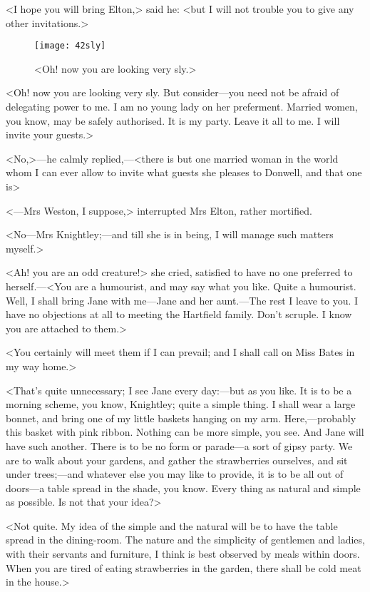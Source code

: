 <I hope you will bring Elton,> said he: <but I will not trouble you to give any other invitations.>

\begin{figure}[tbph]
\centering
\texttt{[image: 42sly]}
\caption{<Oh! now you are looking very sly.>}
\end{figure}


<Oh! now you are looking very sly. But consider—you need not be afraid of delegating power to me. I am no young lady on her preferment. Married women, you know, may be safely authorised. It is my party. Leave it all to me. I will invite your guests.>

<No,>—he calmly replied,—<there is but one married woman in the world whom I can ever allow to invite what guests she pleases to Donwell, and that one is\longdash>

<—Mrs Weston, I suppose,> interrupted Mrs Elton, rather mortified.

<No—Mrs Knightley;—and till she is in being, I will manage such matters myself.>

<Ah! you are an odd creature!> she cried, satisfied to have no one preferred to herself.—<You are a humourist, and may say what you like. Quite a humourist. Well, I shall bring Jane with me—Jane and her aunt.—The rest I leave to you. I have no objections at all to meeting the Hartfield family. Don't scruple. I know you are attached to them.>

<You certainly will meet them if I can prevail; and I shall call on Miss Bates in my way home.>

<That's quite unnecessary; I see Jane every day:—but as you like. It is to be a morning scheme, you know, Knightley; quite a simple thing. I shall wear a large bonnet, and bring one of my little baskets hanging on my arm. Here,—probably this basket with pink ribbon. Nothing can be more simple, you see. And Jane will have such another. There is to be no form or parade—a sort of gipsy party. We are to walk about your gardens, and gather the strawberries ourselves, and sit under trees;—and whatever else you may like to provide, it is to be all out of doors—a table spread in the shade, you know. Every thing as natural and simple as possible. Is not that your idea?>

<Not quite. My idea of the simple and the natural will be to have the table spread in the dining-room. The nature and the simplicity of gentlemen and ladies, with their servants and furniture, I think is best observed by meals within doors. When you are tired of eating strawberries in the garden, there shall be cold meat in the house.>

